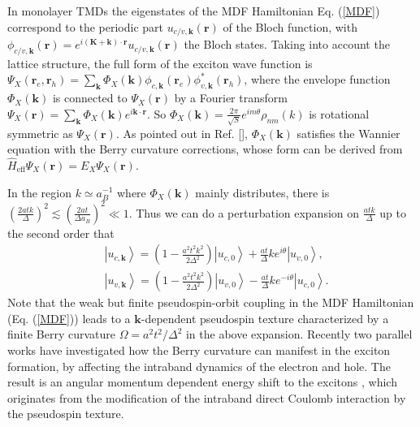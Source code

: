 \documentclass[prb,twocolumn,amsmath,amssymb,superscriptaddress,showpacs]{revtex4}
\begin{document}
In monolayer TMDs the eigenstates of the MDF Hamiltonian Eq. (\ref{MDF}) correspond to the periodic part $u_{c/v,\mathbf{k}}(\mathbf r)$ of the Bloch function, with $\phi_{c/v,\mathbf{k}}(\mathbf r)=e^{i(\mathbf K+\mathbf k)\cdot\mathbf r}u_{c/v,\mathbf{k}}(\mathbf r)$ the Bloch states. Taking into account the lattice structure, the full form of the exciton wave function is $\Psi_{X}(\mathbf{r}_{e},\mathbf{r}_{h})=\sum_{\mathbf{k}}\Phi_{X}(\mathbf{k})\phi_{c,\mathbf{k}}(\mathbf{r}_{e})\phi^*_{v,\mathbf{k}}(\mathbf{r}_{h})$, where the envelope function $\Phi_{X}(\mathbf{k})$ is connected to $\Psi_{X}(\mathbf{r})$ by a Fourier transform $\Psi_{X}(\mathbf{r})=\sum_{\mathbf{k}}\Phi_{X}(\mathbf{k})e^{i\mathbf{k}\cdot\mathbf{r}}$. So $\Phi_{X}(\mathbf{k})=\frac{2\pi}{\sqrt{S}}e^{im\theta}\rho_{nm}(k)$ is rotational symmetric as $\Psi_{X}(\mathbf{r})$. As pointed out in Ref. [], $\Phi_{X}(\mathbf{k})$ satisfies the Wannier equation with the Berry curvature corrections, whose form can be derived from $\hat{H}_\textrm{eff}\Psi_{X}(\mathbf{r})=E_X\Psi_{X}(\mathbf{r})$.

In the region $k\simeq a_{B}^{-1}$ where $\Phi_{X}(\mathbf{k})$ mainly distributes, there is $\left(\frac{2atk}{\Delta}\right)^{2}\lesssim\left(\frac{2at}{\Delta a_{B}}\right)^{2}\ll1$. Thus we can do a perturbation expansion on $\frac{atk}{\Delta}$ up to the second order that
\begin{subequations}
\label{MDFeigenstate}
\begin{align}
&\left|u_{c,\mathbf{k}}\right\rangle =\left(1-\frac{a^{2}t^{2}k^{2}}{2\Delta^{2}}\right)\left|u_{c,0}\right\rangle +\frac{at}{\Delta} ke^{i\theta}\left|u_{v,0}\right\rangle, \label{MDFcstate} \\
&\left|u_{v,\mathbf{k}}\right\rangle =\left(1-\frac{a^{2}t^{2}k^{2}}{2\Delta^{2}}\right)\left|u_{v,0}\right\rangle -\frac{at}{\Delta}ke^{-i\theta}\left|u_{c,0}\right\rangle. \label{MDFvstate}
\end{align}
\end{subequations}
Note that the weak but finite pseudospin-orbit coupling in the MDF Hamiltonian (Eq. (\ref{MDF})) leads to a $\mathbf k$-dependent pseudospin texture characterized by a finite Berry curvature $\Omega=a^2t^2/\Delta^2$ in the above expansion. Recently two parallel works have investigated how the Berry curvature can manifest in the exciton formation, by affecting the intraband dynamics of the electron and hole. The result is an angular momentum dependent energy shift to the excitons \cite{Di Xiao Berry phase and exciton 2015, Imamoglu p-state Berry splitting 2015}, which originates from the modification of the intraband direct Coulomb interaction by the pseudospin texture. 
\end{document}
